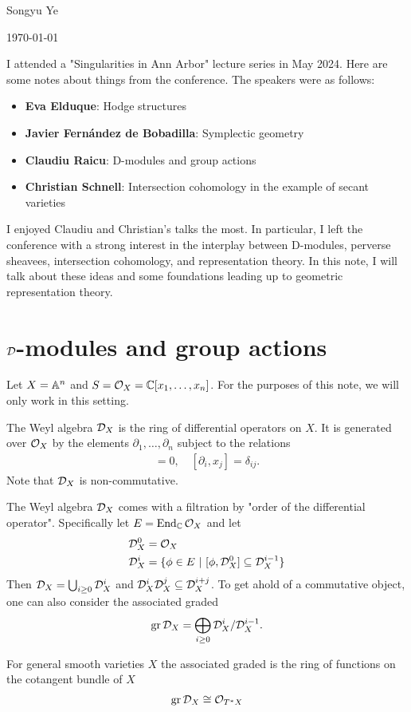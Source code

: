 \documentclass[12pt]{article}
\begin{document}
Songyu Ye

\today

\hfill

I attended a "Singularities in Ann Arbor" lecture series in May 2024. Here are some notes about things from the conference. The speakers 
were as follows: 
\begin{itemize}
    \item \textbf{Eva Elduque}: Hodge structures
    \item \textbf{Javier Fernández de Bobadilla}: Symplectic geometry
    \item \textbf{Claudiu Raicu}: D-modules and group actions 
    \item \textbf{Christian Schnell}: Intersection cohomology in the example of secant varieties
\end{itemize}

I enjoyed Claudiu and Christian's talks the most. In particular, I left the conference with a strong interest in the interplay between
D-modules, perverse sheavees, intersection cohomology, and representation theory. In this note, I will talk about these ideas 
and some foundations leading up to geometric representation theory.

\section{${\mathcal{D}}$-modules and group actions}
Let $X = \mathbb{A}^n$ and $S = {\mathcal{O}}_X = \mathbb{C}[x_1, \ldots, x_n]$. For the purposes of this note, we will only work 
in this setting. 

\begin{definition}
    The Weyl algebra ${\mathcal{D}}_X$ is the ring of differential operators on $X$. It is generated over ${\mathcal{O}}_X$ by the
    elements $\partial_1, \ldots, \partial_n$ subject to the relations \begin{align*}
        [\partial_i, \partial_j] = 0, \quad [\partial_i, x_j] = \delta_{ij}.
    \end{align*}
    Note that ${\mathcal{D}}_X$ is non-commutative.
\end{definition}

The Weyl algebra ${\mathcal{D}}_X$ comes with a filtration by "order of the differential operator". Specifically let $E = \operatorname{End}_{\mathbb{C}}{{\mathcal{O}}_X}$ and let \begin{align*}
    {\mathcal{D}}_X^0 &= {\mathcal{O}}_X \\
    {\mathcal{D}}_X^i &= \{\phi\in E \ \vert \  [\phi, {\mathcal{D}}_X^0] \subseteq {\mathcal{D}}_X^{i-1}\} 
\end{align*} Then ${\mathcal{D}}_X = \bigcup_{i\geq 0} {\mathcal{D}}_X^i$ and ${\mathcal{D}}_X^i{\mathcal{D}}_X^j \subseteq {\mathcal{D}}_X^{i+j}$. 
To get ahold of a commutative object, one can also consider the associated graded \begin{align*}
    \operatorname{gr} {\mathcal{D}}_X = \bigoplus_{i\geq 0} {\mathcal{D}}_X^i/{\mathcal{D}}_X^{i-1}.
\end{align*} 
\begin{proposition}
    For general smooth varieties $X$ the associated graded is the 
    ring of functions on the cotangent bundle of $X$ \begin{align*}
        \operatorname{gr} {\mathcal{D}}_X \cong {\mathcal{O}}_{T^*X}
    \end{align*}
\end{proposition}
\end{document}
